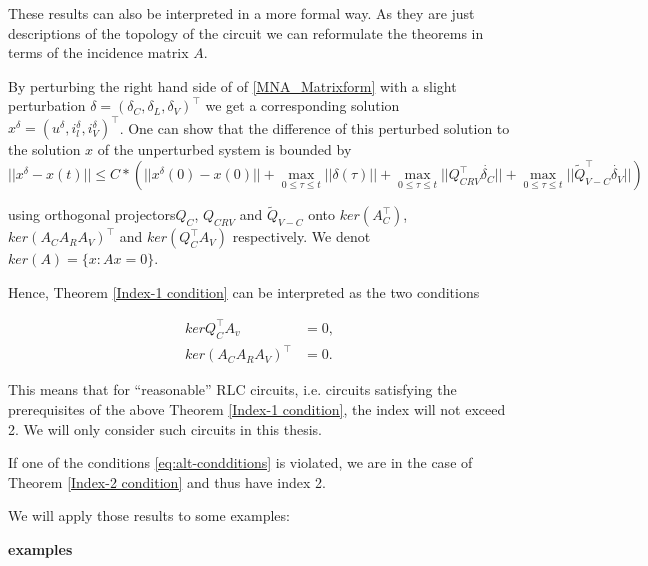 These results can also be interpreted in a more formal way. As they are just descriptions of the topology of the circuit we can reformulate the theorems in terms of the incidence matrix $A$.

By perturbing the right hand side of of \eqref{MNA_Matrixform} with a slight perturbation $\delta = (\delta_C, \delta_L, \delta_V)^\top$ we get a corresponding solution $x^\delta = (u^\delta, i_l^\delta, i_V^\delta)^\top$. One can show that the difference of this perturbed solution to the solution $x$ of the unperturbed system is bounded by
\begin{displaymath}
	|| x^\delta - x(t) || \leq C * \left( ||x^\delta (0) - x(0)|| + \max_{0 \leq \tau \leq t} ||\delta(\tau)|| + \max_{0 \leq \tau \leq t} ||Q_{CRV}^\top \dot{\delta_C}|| + \max_{0 \leq \tau \leq t} ||\tilde{Q}_{V-C}^\top \dot{\delta_V}|| \right)
\end{displaymath}

using orthogonal projectors$Q_C$, $Q_{CRV}$ and $\tilde{Q}_{V-C}$  onto $ker(A_C^\top)$, $ker(A_CA_RA_V)^\top$ and $ker(Q_C^\top A_V)$ respectively. We denot $ker(A) = \{x: Ax = 0\}$.

Hence, Theorem \ref{Index-1 condition} can be interpreted as the two conditions

\begin{equation}
	\label{eq:alt-condditions}
	\begin{aligned}
		kerQ_C^\top A_v &= {0}, \\
		ker(A_C A_R A_V)^\top &= {0}.
	\end{aligned}
\end{equation}
	

This means that for ``reasonable'' RLC circuits, i.e. circuits satisfying the prerequisites of the above Theorem \ref{Index-1 condition}, the index will not exceed 2. We will only consider such circuits in this thesis.

If one of the conditions \eqref{eq:alt-condditions} is violated, we are in the case of Theorem \ref{Index-2 condition} and thus have index 2.

We will apply those results to some examples: %

\textbf{examples}